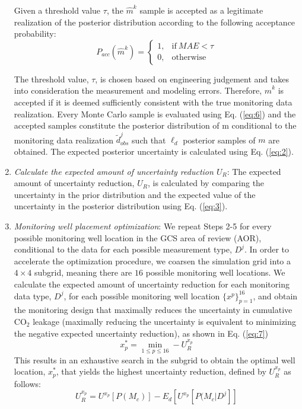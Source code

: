 \documentclass[a4paper,fleqn]{cas-sc}
\begin{document}
\begin{enumerate}[Step 1.]
Given a threshold value $\tau$, the $\hat{m}^k$ sample is accepted as a legitimate realization of the posterior distribution according to the following acceptance probability:
\begin{equation} \label{eq:6}
    P_{acc}(\hat{m}^k) = 
    \begin{cases}
      1, & \text{if}\ MAE<\tau \\
      0, & \text{otherwise}
    \end{cases}
\end{equation}

The threshold value, $\tau$, is chosen based on engineering judgement and takes into consideration the measurement and modeling errors. Therefore, $\hat{m}^k$ is accepted if it is deemed sufficiently consistent with the true monitoring data realization. Every Monte Carlo sample is evaluated using Eq. (\ref{eq:6}) and the accepted samples constitute the posterior distribution of m conditional to the monitoring data realization $\widetilde{d}^j_{obs}$ such that $\ell_d$ posterior samples of $m$ are obtained. The expected posterior uncertainty is calculated using Eq. (\ref{eq:2}). 

\item \textit{Calculate the expected amount of uncertainty reduction $U_R$}: The expected amount of uncertainty reduction, $U_R$, is calculated by comparing the uncertainty in the prior distribution and the expected value of the uncertainty in the posterior distribution using Eq. (\ref{eq:3}). 

\item \textit{Monitoring well placement optimization}: We repeat Steps 2-5 for every possible monitoring well location in the GCS area of review (AOR), conditional to the data for each possible measurement type, $D^j$. In order to accelerate the optimization procedure, we coarsen the simulation grid into a $4\times4$ subgrid, meaning there are $16$ possible monitoring well locations. We calculate the expected amount of uncertainty reduction for each monitoring data type, $D^j$, for each possible monitoring well location $\{{x^p}\}_{p=1}^{16}$, and obtain the monitoring design that maximally reduces the uncertainty in cumulative CO$_2$ leakage (maximally reducing the uncertainty is equivalent to minimizing the negative expected uncertainty reduction), as shown in Eq. (\ref{eq:7})
\begin{equation} \label{eq:7}
    x_p^* = \min\limits_{1\leq p \leq 16} -U_R^{x_p}
\end{equation}
This results in an exhaustive search in the subgrid to obtain the optimal well location, $x_p^*$, that yields the highest uncertainty reduction, defined by $U_R^{x_p}$ as follows:
\begin{equation} \label{eq:8}
    U_R^{x_p} = U^{x_p}[P(M_c)] - E_d[U^{x_p}[P(M_c \vert D^j]]
\end{equation}
\end{enumerate}
\end{document}
